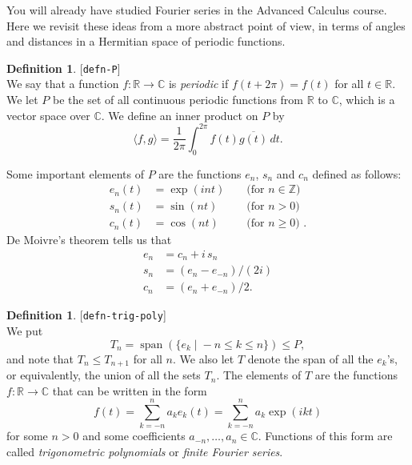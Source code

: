\documentclass{amsart}
\newcommand{\lbl}[1]{\label{#1}\textup{[\texttt{#1}]}\ \\}
\newcommand{\lbl}{\label}
\newcommand{\R}         {{\mathbb{R}}}
\newcommand{\C}         {{\mathbb{C}}}
\newcommand{\Z}         {{\mathbb{Z}}}
\newcommand{\spn}       {\operatorname{span}}
\newcommand{\xra}       {\xrightarrow}
\newcommand{\st}        {\;|\;}
\newcommand{\ip}[1]     {\langle #1\rangle}
\newcommand{\ov}[1]     {\overline{#1}}
\renewcommand{\:}       {\colon}
\theoremstyle{definition}
\newtheorem{definition}[theorem]{Definition}
\begin{document}
You will already have studied Fourier series in the Advanced
Calculus course.  Here we revisit these ideas from a more
abstract point of view, in terms of angles and distances in
a Hermitian space of periodic functions.  

\begin{definition}\lbl{defn-P}
 We say that a function $f\:\R\xra{}\C$ is \emph{periodic}
 if $f(t+2\pi)=f(t)$ for all $t\in\R$.  We let $P$ be the set
 of all continuous periodic functions from $\R$ to $\C$,
 which is a vector space over $\C$.  We define an inner
 product on $P$ by 
 \[ \ip{f,g} =
     \frac{1}{2\pi}\int_0^{2\pi} f(t)\ov{g(t)}\,dt.
 \]
\end{definition}

Some important elements of $P$ are the functions $e_n$,
$s_n$ and $c_n$ defined as follows:
\begin{align*}
 e_n(t) &= \exp(i n t) && \text{ (for $n\in\Z$)  }\\
 s_n(t) &= \sin(n t) && \text{ (for $n>0$)  }\\
 c_n(t) &= \cos(n t) && \text{ (for $n\geq 0$) }.
\end{align*}
De Moivre's theorem tells us that
\begin{align*}
 e_n &= c_n + i\,s_n \\
 s_n &= (e_n - e_{-n})/(2i) \\
 c_n &= (e_n + e_{-n})/2.
\end{align*}

\begin{definition}\lbl{defn-trig-poly}
 We put 
 \[ T_n = \spn(\{e_k \st -n \leq k\leq n\}) \leq P, \]
 and note that $T_n\leq T_{n+1}$ for all $n$.  We also let
 $T$ denote the span of all the $e_k$'s, or equivalently,
 the union of all the sets $T_n$.  The elements of $T$ are
 the functions $f\:\R\xra{}\C$ that can be written in the
 form 
 \[ f(t) = \sum_{k=-n}^n a_k e_k(t) = 
           \sum_{k=-n}^n a_k \exp(ikt)
 \]
 for some $n>0$ and some coefficients
 $a_{-n},\dotsc,a_n\in\C$.  Functions of this form are
 called \emph{trigonometric polynomials} or \emph{finite
  Fourier series}.  
\end{definition}
\end{document}
